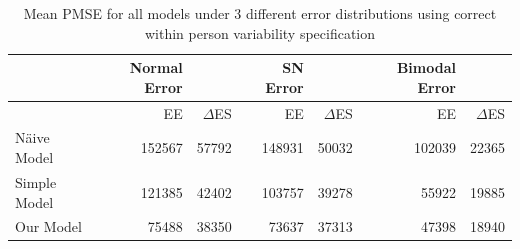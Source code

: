 \documentclass[11pt]{article}\usepackage[]{graphicx}\usepackage[]{color}
\begin{document}
% 
% 
%   
% 
% 

\begin{table}[ht]
\centering
\begin{tabular}{l|rr|rr|rr}
  \hline
 & Normal Error & & SN Error & & Bimodal Error & \\ 
  \hline
  & EE & $\Delta$ES & EE & $\Delta$ES & EE & $\Delta$ES \\
  \hline
  N{\"a}ive Model & 152567 & 57792 & 148931 & 50032 & 102039 & 22365 \\
  Simple Model & 121385  & 42402 & 103757 & 39278 & 55922 & 19885 \\
  Our Model & 75488 & 38350 & 73637 & 37313 & 47398 & 18940 \\
   \hline
\end{tabular}
\caption{Mean PMSE for all models under 3 different error distributions using correct within person variability specification}
\label{pmse2}
\end{table}
\end{document}
